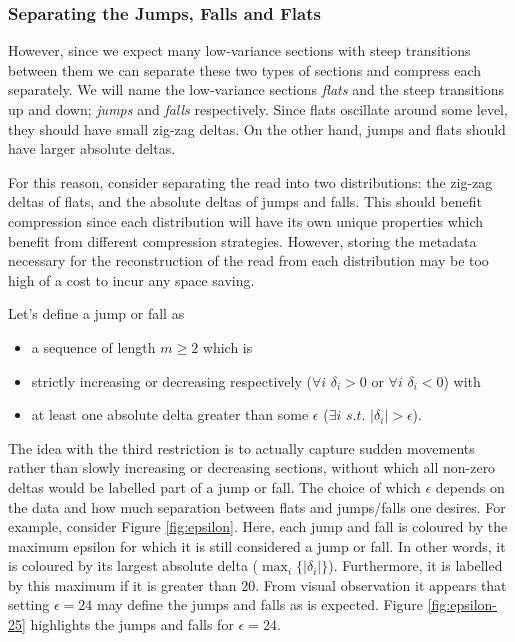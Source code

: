 \subsubsection{Separating the Jumps, Falls and Flats} \label{sec:jumps}

However, since we expect many low-variance sections with steep transitions
between them we can separate these two types of sections and compress each
separately. We will name the low-variance sections \textit{flats} and the
steep transitions up and down; \textit{jumps} and \textit{falls} respectively.
Since flats oscillate around some level, they should have small zig-zag deltas.
On the other hand, jumps and flats should have larger absolute deltas.



For this reason, consider separating the read into two distributions: the
zig-zag deltas of flats, and the absolute deltas of jumps and falls. This should
benefit compression since each distribution will have its own unique properties
which benefit from different compression strategies. However, storing the
metadata necessary for the reconstruction of the read from each distribution may
be too high of a cost to incur any space saving.

Let's define a jump or fall as
\begin{itemize}
	\item a sequence of length $m\ge 2$ which is
	\item strictly increasing or decreasing respectively ($\forall i$ $\delta_i>0$ or $\forall i$ $\delta_i < 0$) with
	\item at least one absolute delta greater than some $\epsilon$ ($\exists i$ $s.t.$ $|\delta_i|>\epsilon$).
\end{itemize}

The idea with the third restriction is to actually capture sudden movements
rather than slowly increasing or decreasing sections, without which all non-zero
deltas would be labelled part of a jump or fall. The choice of which $\epsilon$
depends on the data and how much separation between flats and jumps/falls one
desires. For example, consider Figure \ref{fig:epsilon}. Here, each jump and fall
is coloured by the maximum epsilon for which it is still considered a jump or
fall. In other words, it is coloured by its largest absolute delta
($\max_i\{|\delta_i|\}$). Furthermore, it is labelled by this maximum if it is
greater than 20. From visual observation it appears that setting $\epsilon=24$
may define the jumps and falls as is expected. Figure \ref{fig:epsilon-25}
highlights the jumps and falls for $\epsilon=24$.

